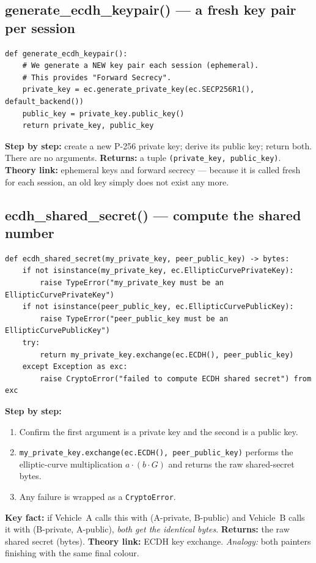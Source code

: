 \documentclass[11pt,a4paper]{article}
\begin{document}
\subsection{generate\_ecdh\_keypair() --- a fresh key pair per session}
\begin{lstlisting}[style=py,caption={crypto.py --- generate an ephemeral ECDH key pair.}]
def generate_ecdh_keypair():
    # We generate a NEW key pair each session (ephemeral).
    # This provides "Forward Secrecy".
    private_key = ec.generate_private_key(ec.SECP256R1(), default_backend())
    public_key = private_key.public_key()
    return private_key, public_key
\end{lstlisting}
\textbf{Step by step:} create a new P-256 private key; derive its public key;
return both. There are no arguments. \textbf{Returns:} a tuple
\texttt{(private\_key, public\_key)}. \textbf{Theory link:} ephemeral keys and
forward secrecy --- because it is called fresh for each session, an old key
simply does not exist any more.

\subsection{ecdh\_shared\_secret() --- compute the shared number}
\begin{lstlisting}[style=py,caption={crypto.py --- ECDH shared-secret computation.}]
def ecdh_shared_secret(my_private_key, peer_public_key) -> bytes:
    if not isinstance(my_private_key, ec.EllipticCurvePrivateKey):
        raise TypeError("my_private_key must be an EllipticCurvePrivateKey")
    if not isinstance(peer_public_key, ec.EllipticCurvePublicKey):
        raise TypeError("peer_public_key must be an EllipticCurvePublicKey")
    try:
        return my_private_key.exchange(ec.ECDH(), peer_public_key)
    except Exception as exc:
        raise CryptoError("failed to compute ECDH shared secret") from exc
\end{lstlisting}
\textbf{Step by step:}
\begin{enumerate}
  \item Confirm the first argument is a private key and the second is a public key.
  \item \texttt{my\_private\_key.exchange(ec.ECDH(), peer\_public\_key)} performs
        the elliptic-curve multiplication $a\cdot(b\cdot G)$ and returns the raw
        shared-secret bytes.
  \item Any failure is wrapped as a \texttt{CryptoError}.
\end{enumerate}
\textbf{Key fact:} if Vehicle~A calls this with (A-private, B-public) and
Vehicle~B calls it with (B-private, A-public), \emph{both get the identical
bytes}. \textbf{Returns:} the raw shared secret (bytes). \textbf{Theory link:}
ECDH key exchange. \emph{Analogy:} both painters finishing with the same final
colour.
\end{document}
